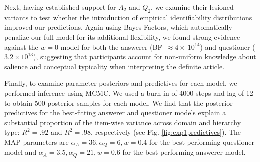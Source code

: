 \documentclass[11pt, floatsintext]{apa6}
\begin{document}
Next, having established support for $A_2$ and $Q_2$, we examine their lesioned variants to test whether the introduction of empirical identifiability distributions improved our predictions. 
Again using Bayes Factors, which automatically penalize our full model for its additional flexibility, we found strong evidence against the $w=0$ model for both the answerer (BF~$\approx4\times~10^{14}$) and questioner ($3.2 \times 10^{13}$), suggesting that participants account for non-uniform knowledge about salience and conceptual typicality when interpreting the definite article.

Finally, to examine parameter posteriors and predictives for each model, we performed inference using MCMC.
We used a burn-in of 4000 steps and lag of 12 to obtain 500 posterior samples for each model.
We find that the posterior predictives for the best-fitting answerer and questioner models explain a substantial proportion of the item-wise variance across domain and hierarchy type: $R^2 = .92$ and $R^2 = .98$, respectively (see Fig. \ref{fig:exp1predictives}). 
The MAP parameters are $\alpha_A = 36, \alpha_Q = 6, w = 0.4$ for the best performing questioner model and $\alpha_A = 3.5, \alpha_Q = 21, w = 0.6$ for the best-performing answerer model.


%


%

%


%
%
%
\end{document}
